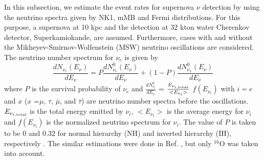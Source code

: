 \documentclass[preprint,12pt]{elsarticle}
\begin{document}
In this subsection, we estimate the event rates for supernova $\nu$ detection by using the neutrino spectra given by NK1, mMB and Fermi distributions. 
For this purpose, a supernova at 10 kpc and the detection at 32 kton water Cherenkov detector, Superkamiokande, are assumed.
Furthermore, cases with and without the Mikheyev-Smirnov-Wolfenstein (MSW) neutrino oscillations \cite{MSW} are considered.
The neutrino number spectrum for $\nu_e$ 
is given by \cite{Nakazato2018} 
\begin{equation}
\frac{dN_{\nu_e}(E_{\nu})}{dE_{\nu}} =  P \frac{dN_{\nu_e}^{0}(E_{\nu})}{dE_{\nu}} + (1-P) \frac{dN_{\nu_x}^{0}(E_{\nu})}{dE_{\nu}}
\end{equation}
where $P$ is the survival probability of $\nu_{e}$ and $\frac{d N_{\nu_{i}}^{0}}{d E_{\nu}}$ = $\frac{E_{\nu_{i,{\rm total}}}}{<E_{\nu_{i}}>}$ $f(E_{\nu_{i}})$ with $i=e$ and $x$ ($x$ =$\mu$, $\tau$, $\bar{\mu}$, and $\bar{\tau}$) are neutrino number spectra before the oscillations. $E_{\nu_{i,{\rm total}}}$ is the total energy emitted by $\nu_{i}$, $<E_{\nu_{i}}>$ is the average energy for $\nu_{i}$ and $f(E_{\nu_{i}})$ is the normalized neutrino spectrum for $\nu_{i}$. 
The value of $P$ is taken to be 0 and 0.32 for normal hierarchy (NH) and inverted hierarchy (IH), respectively \cite{Dighe}.
The similar estimations were done in Ref. \cite{Nakazato2018}, but only $^{16}$O was taken into account.
\end{document}
